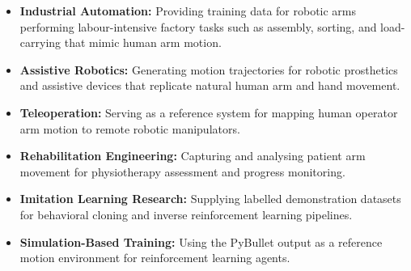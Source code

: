 \begin{itemize}
    \item \textbf{Industrial Automation:} Providing training data for robotic arms performing labour-intensive factory tasks such as assembly, sorting, and load-carrying that mimic human arm motion.
    \item \textbf{Assistive Robotics:} Generating motion trajectories for robotic prosthetics and assistive devices that replicate natural human arm and hand movement.
    \item \textbf{Teleoperation:} Serving as a reference system for mapping human operator arm motion to remote robotic manipulators.
    \item \textbf{Rehabilitation Engineering:} Capturing and analysing patient arm movement for physiotherapy assessment and progress monitoring.
    \item \textbf{Imitation Learning Research:} Supplying labelled demonstration datasets for behavioral cloning and inverse reinforcement learning pipelines.
    \item \textbf{Simulation-Based Training:} Using the PyBullet output as a reference motion environment for reinforcement learning agents.
\end{itemize} 
